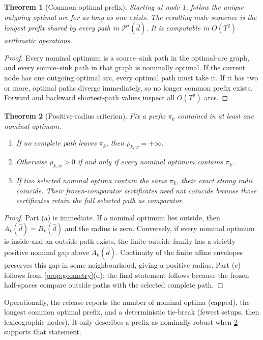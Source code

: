 \documentclass[11pt]{article}
\newtheorem{theorem}{Theorem}[section]
\theoremstyle{definition}
\newcommand{\cP}{\mathcal{P}}
\newcommand{\dhat}{\widehat d}
\begin{document}
\begin{theorem}[Common optimal prefix]\label{thm:commonprefix}
Starting at node 1, follow the unique outgoing optimal arc for as long as one exists. The resulting node sequence is the longest prefix shared by every path in $\cP^\star(\dhat)$. It is computable in $O(T^2)$ arithmetic operations.
\end{theorem}

\begin{proof}
Every nominal optimum is a source--sink path in the optimal-arc graph, and every source--sink path in that graph is nominally optimal. If the current node has one outgoing optimal arc, every optimal path must take it. If it has two or more, optimal paths diverge immediately, so no longer common prefix exists. Forward and backward shortest-path values inspect all $O(T^2)$ arcs.
\end{proof}

\begin{theorem}[Positive-radius criterion]\label{thm:positive}
Fix a prefix $\pi_k$ contained in at least one nominal optimum.
\begin{enumerate}[label=(\alph*)]
\item If no complete path leaves $\pi_k$, then $\rho_{k,w}=+\infty$.
\item Otherwise $\rho_{k,w}>0$ if and only if every nominal optimum contains $\pi_k$.
\item If two selected nominal optima contain the same $\pi_k$, their exact strong radii coincide. Their frozen-comparator certificates need not coincide because those certificates retain the full selected path as comparator.
\end{enumerate}
\end{theorem}

\begin{proof}
Part (a) is immediate. If a nominal optimum lies outside, then $A_k(\dhat)=B_k(\dhat)$ and the radius is zero. Conversely, if every nominal optimum is inside and an outside path exists, the finite outside family has a strictly positive nominal gap above $A_k(\dhat)$. Continuity of the finite affine envelopes preserves this gap in some neighbourhood, giving a positive radius. Part (c) follows from \cref{prop:geometry}(d); the final statement follows because the frozen half-spaces compare outside paths with the selected complete path.
\end{proof}

Operationally, the release reports the number of nominal optima (capped), the longest common optimal prefix, and a deterministic tie-break (fewest setups, then lexicographic nodes). It only describes a prefix as nominally robust when \cref{thm:positive} supports that statement.
\end{document}
